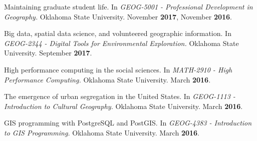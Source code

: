 \begin{cventries}

  \cventry
    {}
    {}
    {}
    {}
    {
       \begin{cvitems}
          \vspace{-3mm}
        \item {Maintaining graduate student life. In \textit{GEOG-5001 -
              Professional Development in Geography.} Oklahoma State University.
            November \textbf{2017}, November \textbf{2016}.}
          \end{cvitems}
        } %

  \cventry
    {}
    {}
    {}
    {}
    {
      \begin{cvitems}
        \vspace{-3mm}
      \item {Big data, spatial data science, and volunteered geographic
          information. In \textit{GEOG-2344 - Digital Tools for Environmental
            Exploration.} Oklahoma State University. September \textbf{2017}}.
        \end{cvitems}
    }

  \cventry
    {}
    {}
    {}
    {}
    {
       \begin{cvitems}
         \vspace{-3mm}
       \item {High performance computing in the social sciences. In
           \textit{MATH-2910 - High Performance Computing.} Oklahoma State
           University. March \textbf{2016}.}
          \end{cvitems}
        } %
          
  \cventry
    {}
    {}
    {}
    {}
    {
       \begin{cvitems}
          \vspace{-3mm}
        \item {The emergence of urban segregation in the United States. In
            \textit{GEOG-1113 - Introduction to Cultural Geography.} Oklahoma
            State University. March \textbf{2016}.}
          \end{cvitems}
        } %

  \cventry
    {}
    {}
    {}
    {}
    {
      \begin{cvitems}
        \vspace{-3mm}
      \item {GIS programming with PostgreSQL and PostGIS. In \textit{GEOG-4383 -
            Introduction to GIS Programming.} Oklahoma State University. March
          \textbf{2016}.}
            \end{cvitems}
        } %


\end{cventries}
